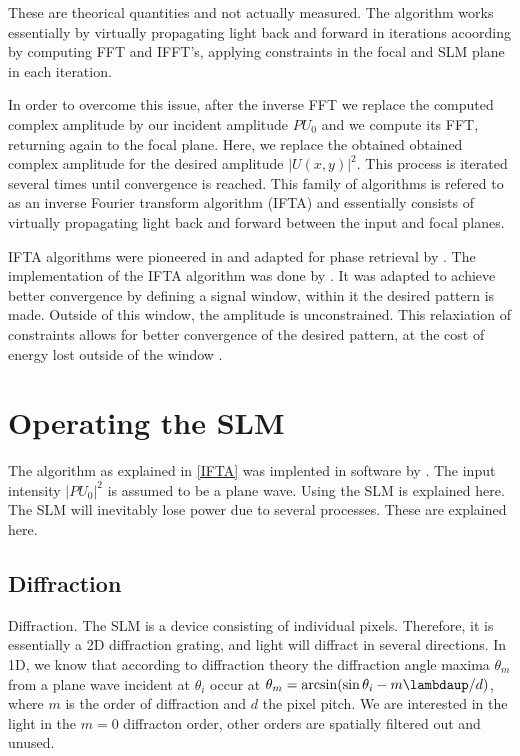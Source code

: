 These are theorical quantities and not actually measured. The algorithm works essentially by virtually propagating light back and forward in iterations acoording by computing FFT and IFFT's, applying constraints in the focal and SLM plane in each iteration. 




In order to overcome this issue, after the inverse FFT we replace the computed complex amplitude by our incident amplitude $PU_0$ and we compute its FFT, returning again to the focal plane. Here, we replace the obtained obtained complex amplitude for the desired amplitude $|U(x,y)|^2$. This process is iterated several times until convergence is reached. This family of algorithms is refered to as an inverse Fourier transform algorithm (IFTA) and essentially consists of virtually propagating light back and forward between the input and focal planes. 

IFTA algorithms were pioneered in\cite{Hirsch1971} and adapted for phase retrieval by \cite{Gerschberg1972}. The implementation of the IFTA algorithm was done by \cite{Bijnen2013,Bijnen2015}. It was adapted to achieve better convergence by defining a signal window, within it the desired pattern is made. Outside of this window, the amplitude is unconstrained. This relaxiation of constraints allows for better convergence of the desired pattern, at the cost of energy lost outside of the window \cite{Bijnen2013,Bijnen2015}.

\section{Operating the SLM}

The algorithm as explained in \cref{IFTA} was implented in software by \cite{Bijnen2015}. The input intensity $|PU_0|^2$ is assumed to be a plane wave. Using the SLM is explained here. The SLM will inevitably lose power due to several processes. These are explained here. 

\subsection{Diffraction}

Diffraction. The SLM is a device consisting of individual pixels. Therefore, it is essentially a 2D diffraction grating, and light will diffract in several directions. In 1D, we know that according to diffraction theory the diffraction angle maxima $\theta_m$ from a plane wave incident at $\theta_i$ occur at $\theta_m = \arcsin(\sin\theta_i - m\lambdaup/d)$, where $m$ is the order of diffraction and $d$ the pixel pitch. We are interested in the light in the $m=0$ diffracton order, other orders are spatially filtered out and unused.

